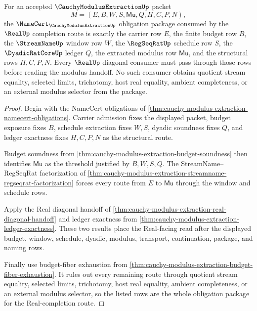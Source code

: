 \begin{theorem}
\label{thm:cauchy-modulus-extraction-obligation-closure-package}
For an accepted $\CauchyModulusExtractionUp$ packet
$$
M=(E,B,W,S,\mathsf{Mu},Q,H,C,P,N),
$$
the $\NameCert_{\CauchyModulusExtractionUp}$ obligation package consumed by the $\RealUp$ completion route is exactly the carrier row $E$, the finite budget row $B$, the $\StreamNameUp$ window row $W$, the $\RegSeqRatUp$ schedule row $S$, the $\DyadicRatCoreUp$ ledger $Q$, the extracted modulus row $\mathsf{Mu}$, and the structural rows $H,C,P,N$. Every $\RealUp$ diagonal consumer must pass through those rows before reading the modulus handoff. No such consumer obtains quotient stream equality, selected limits, trichotomy, host real equality, ambient completeness, or an external modulus selector from the package.
\end{theorem}
\begin{proof}
Begin with the NameCert obligations of \autoref{thm:cauchy-modulus-extraction-namecert-obligations}. Carrier admission fixes the displayed packet, budget exposure fixes $B$, schedule extraction fixes $W,S$, dyadic soundness fixes $Q$, and ledger exactness fixes $H,C,P,N$ as the structural route.

Budget soundness from \autoref{thm:cauchy-modulus-extraction-budget-soundness} then identifies $\mathsf{Mu}$ as the threshold justified by $B,W,S,Q$. The StreamName--RegSeqRat factorization of \autoref{thm:cauchy-modulus-extraction-streamname-regseqrat-factorization} forces every route from $E$ to $\mathsf{Mu}$ through the window and schedule rows.

Apply the Real diagonal handoff of \autoref{thm:cauchy-modulus-extraction-real-diagonal-handoff} and ledger exactness from \autoref{thm:cauchy-modulus-extraction-ledger-exactness}. These two results place the Real-facing read after the displayed budget, window, schedule, dyadic, modulus, transport, continuation, package, and naming rows.

Finally use budget-fiber exhaustion from \autoref{thm:cauchy-modulus-extraction-budget-fiber-exhaustion}. It rules out every remaining route through quotient stream equality, selected limits, trichotomy, host real equality, ambient completeness, or an external modulus selector, so the listed rows are the whole obligation package for the Real-completion route.
\end{proof}

